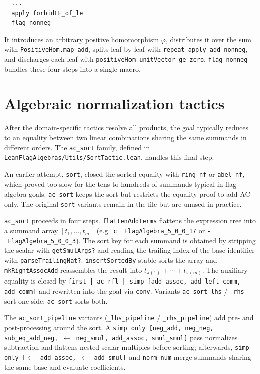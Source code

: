 \documentclass[11pt]{article}
\begin{document}
\begin{lstlisting}
  ...
  apply forbidLE_of_le
  flag_nonneg
\end{lstlisting}

It introduces an arbitrary positive homomorphism $\varphi$,
distributes it over the sum with \texttt{PositiveHom.map\_add},
splits leaf-by-leaf with \texttt{repeat apply add\_nonneg}, and
discharges each leaf with \texttt{positiveHom\_unitVector\_ge\_zero}.
\texttt{flag\_nonneg} bundles these four steps into a single macro.

\section{Algebraic normalization tactics}

After the domain-specific tactics resolve all products, the goal typically
reduces to an equality between two linear combinations sharing the same summands
in different orders. The \texttt{ac\_sort} family, defined in
\texttt{LeanFlagAlgebras/Utils/SortTactic.lean}, handles this final step.

An earlier attempt, \texttt{sort}, closed the sorted equality with
\texttt{ring\_nf} or \texttt{abel\_nf}, which proved too slow for the
tens-to-hundreds of summands typical in flag algebra goals. \texttt{ac\_sort}
keeps the sort but restricts the equality proof to add-AC only. The original
\texttt{sort} variants remain in the file but are unused in practice.

\texttt{ac\_sort} proceeds in four steps. \texttt{flattenAddTerms} flattens the
expression tree into a summand array $[t_1, \ldots, t_m]$ (e.g.\
\texttt{c~{\small\textbullet}~FlagAlgebra\_5\_0\_0\_17} or
\texttt{-~FlagAlgebra\_5\_0\_0\_3}). The sort key for each summand is obtained
by stripping the scalar with \texttt{getSmulArgs?} and reading the trailing
index of the base identifier with \texttt{parseTrailingNat?}.
\texttt{insertSortedBy} stable-sorts the array and \texttt{mkRightAssocAdd}
reassembles the result into $t_{\pi(1)} + \cdots + t_{\pi(m)}$. The auxiliary
equality is closed by
\texttt{first | ac\_rfl | simp [add\_assoc, add\_left\_comm, add\_comm]} and
rewritten into the goal via \texttt{conv}. Variants \texttt{ac\_sort\_lhs} /
\texttt{\_rhs} sort one side; \texttt{ac\_sort} sorts both.

The \texttt{ac\_sort\_pipeline} variants (\texttt{\_lhs\_pipeline} /
\texttt{\_rhs\_pipeline}) add pre- and post-processing around the sort. A
\texttt{simp only [neg\_add, neg\_neg, sub\_eq\_add\_neg,
$\leftarrow$~neg\_smul, add\_assoc, smul\_smul]} pass normalizes subtraction
and flattens nested scalar multiples before sorting; afterwards,
\texttt{simp only [$\leftarrow$~add\_assoc, $\leftarrow$~add\_smul]} and
\texttt{norm\_num} merge summands sharing the same base and evaluate
coefficients.
\end{document}
